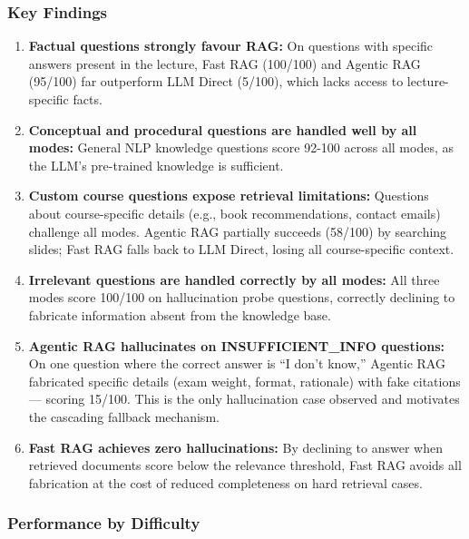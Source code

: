 \subsubsection{Key Findings}

\begin{enumerate}
    \item \textbf{Factual questions strongly favour RAG:} On questions with specific answers present in the lecture, Fast RAG (100/100) and Agentic RAG (95/100) far outperform LLM Direct (5/100), which lacks access to lecture-specific facts.

    \item \textbf{Conceptual and procedural questions are handled well by all modes:} General NLP knowledge questions score 92-100 across all modes, as the LLM's pre-trained knowledge is sufficient.

    \item \textbf{Custom course questions expose retrieval limitations:} Questions about course-specific details (e.g., book recommendations, contact emails) challenge all modes. Agentic RAG partially succeeds (58/100) by searching slides; Fast RAG falls back to LLM Direct, losing all course-specific context.

    \item \textbf{Irrelevant questions are handled correctly by all modes:} All three modes score 100/100 on hallucination probe questions, correctly declining to fabricate information absent from the knowledge base.

    \item \textbf{Agentic RAG hallucinates on INSUFFICIENT\_INFO questions:} On one question where the correct answer is ``I don't know,'' Agentic RAG fabricated specific details (exam weight, format, rationale) with fake citations --- scoring 15/100. This is the only hallucination case observed and motivates the cascading fallback mechanism.

    \item \textbf{Fast RAG achieves zero hallucinations:} By declining to answer when retrieved documents score below the relevance threshold, Fast RAG avoids all fabrication at the cost of reduced completeness on hard retrieval cases.
\end{enumerate}

\subsubsection{Performance by Difficulty}

